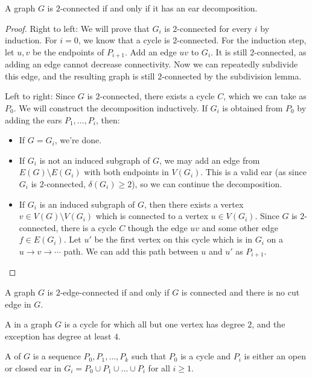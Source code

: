 \begin{theorem}
  A graph $G$ is $2$-connected if and only if it has an ear decomposition.
\end{theorem}

\begin{proof}
  Right to left:
  We will prove that $G_i$ is $2$-connected for every $i$ by induction.
  For $i=0$, we know that a cycle is $2$-connected.
  For the induction step, let $u,v$ be the endpoints of $P_{i+1}$.
  Add an edge $uv$ to $G_i$.
  It is still $2$-connected, as adding an edge cannot decrease connectivity.
  Now we can repeatedly subdivide this edge, and the resulting graph is still
  $2$-connected by the subdivision lemma.

  Left to right:
  Since $G$ is $2$-connected, there exists a cycle $C$, which we can take as
  $P_0$.
  We will construct the decomposition inductively.
  If $G_i$ is obtained from $P_0$ by adding the ears $P_1, \ldots, P_i$, then:
  \begin{itemize}
  \item If $G = G_i$, we're done.
  \item If $G_i$ is not an induced subgraph of $G$, we may add an edge from
	$E(G) \setminus E(G_i)$ with both endpoints in $V(G_i)$.
	This is a valid ear (as since $G_i$ is $2$-connected, $\delta(G_i) \ge 2$),
	so we can continue the decomposition.
  \item If $G_i$ is an induced subgraph of $G$, then there exists a vertex $v
	\in V(G) \setminus V(G_i)$ which is connected to a vertex $u \in V(G_i)$.
	Since $G$ is $2$-connected, there is a cycle $C$ though the edge $uv$ and
	some other edge $f \in E(G_i)$.
	Let $u'$ be the first vertex on this cycle which is in $G_i$ on a $u \to v
	\to \cdots$ path.
	We can add this path between $u$ and $u'$ as $P_{i+1}$.
	\qedhere
  \end{itemize}
\end{proof}

\begin{proposition}
  A graph $G$ is $2$-edge-connected if and only if $G$ is connected and there is
  no cut edge in $G$.
\end{proposition}

\begin{definition}
  A  in a graph $G$ is a cycle for which all but one vertex
  has degree $2$, and the exception has degree at least $4$.
\end{definition}

\begin{definition}
  A  of $G$ is a sequence $P_0, P_1, \ldots,
  P_k$ such that $P_0$ is a cycle and $P_i$ is either an open or closed ear in
  $G_i = P_0 \cup P_1 \cup \ldots \cup P_i$ for all $i \ge 1$.
\end{definition}

